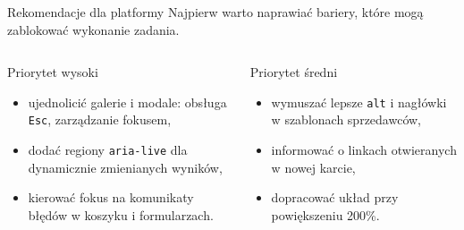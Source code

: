 \documentclass[aspectratio=169,11pt]{beamer}
\newcommand{\tagline}[1]{\textcolor{Slate}{\small #1}}
\begin{document}
\begin{frame}{Rekomendacje dla platformy}
  \tagline{Najpierw warto naprawiać bariery, które mogą zablokować wykonanie zadania.}

  \vspace{0.25cm}
  \begin{columns}[T,totalwidth=\textwidth]
      \begin{alertblock}{Priorytet wysoki}
        \begin{itemize}
          \item ujednolicić galerie i modale: obsługa \texttt{Esc}, zarządzanie fokusem,
          \item dodać regiony \texttt{aria-live} dla dynamicznie zmienianych wyników,
          \item kierować fokus na komunikaty błędów w koszyku i formularzach.
        \end{itemize}
      \end{alertblock}

      \begin{block}{Priorytet średni}
        \begin{itemize}
          \item wymuszać lepsze \texttt{alt} i nagłówki w szablonach sprzedawców,
          \item informować o linkach otwieranych w nowej karcie,
          \item dopracować układ przy powiększeniu 200\%.
        \end{itemize}
      \end{block}
  \end{columns}
\end{frame}
\end{document}
